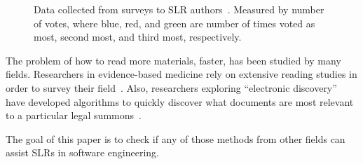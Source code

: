 \documentclass[final,twocolumn,5p]{elsarticle}
\theoremstyle{break}
\begin{document}
\begin{figure}[ht]
    \centering
    \caption{Data collected from surveys to SLR authors~\cite{carver2013identifying}. Measured by number of votes, where blue, red, and green are number of times voted as most, second most, and third most, respectively.}
    \label{fig:barrier}
\end{figure}


The problem of how to read more materials, faster, has been studied by many fields.
Researchers in evidence-based medicine rely on extensive reading studies in order
to survey their field~\cite{wallace2010semi,wallace2010active}.
Also, researchers exploring ``electronic discovery''
have developed algorithms  to quickly discover what documents
are most relevant to a particular legal
summons~\cite{cormack2014evaluation,cormack2015autonomy}.

The goal of this paper is to check if any of those methods
from other fields can assist SLRs in software engineering.
\end{document}
